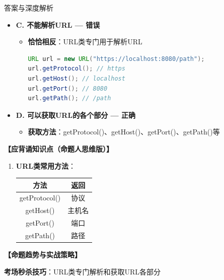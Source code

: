 \documentclass[12pt, a4paper]{ctexart}
\begin{document}
\begin{enumerate}[label=\textbf{\arabic*.}]
\begin{bluebox}{答案与深度解析}
\begin{itemize}[label={}, leftmargin=*, nosep]
		      \item \textbf{C. 不能解析URL — 错误}
		      \begin{itemize}[label={}, leftmargin=*, nosep]
			      \item \textbf{恰恰相反}：URL类专门用于解析URL
			            \begin{lstlisting}[language=Java]
URL url = new URL("https://localhost:8080/path");
url.getProtocol(); // https
url.getHost(); // localhost
url.getPort(); // 8080
url.getPath(); // /path
      \end{lstlisting}
		      \end{itemize}

		      \item \textbf{D. 可以获取URL的各个部分 — 正确}
		      \begin{itemize}[label={}, leftmargin=*, nosep]
			      \item \textbf{获取方法}：getProtocol()、getHost()、getPort()、getPath()等
		      \end{itemize}

		      \end{itemize}

		      \textbf{【应背诵知识点（命题人思维版）】}
		      \begin{enumerate}[leftmargin=*, nosep]
			      \item \textbf{URL类常用方法}：
			            \begin{tabular}{|c|c|}
				            \hline
				            \textbf{方法}   & \textbf{返回} \\
				            \hline
				            getProtocol() & 协议          \\
				            \hline
				            getHost()     & 主机名         \\
				            \hline
				            getPort()     & 端口          \\
				            \hline
				            getPath()     & 路径          \\
				            \hline
			            \end{tabular}
		      \end{enumerate}

		      \textbf{【命题趋势与实战策略】}

		      \textbf{考场秒杀技巧}：URL类专门解析和获取URL各部分
	      \end{bluebox}


\end{enumerate}
\end{document}
